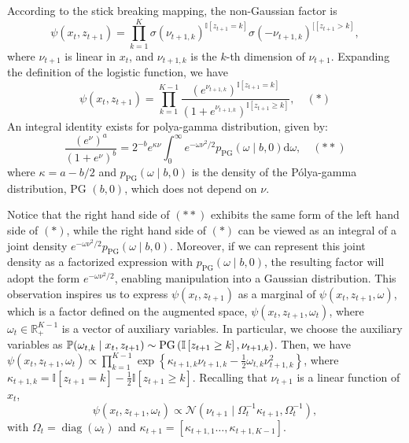 According to the stick breaking mapping, the non-Gaussian factor is
$$\psi\left(x_{t}, z_{t+1}\right)=\prod_{k=1}^{K} \sigma\left(\nu_{t+1, k}\right)^{\mathbb{I}\left[z_{t+1}=k\right]} \sigma\left(-\nu_{t+1, k}\right)^{\mathbb{[}\left[z_{t+1}>k\right]},$$ where  $\nu_{t+1}$ is linear in $x_{t}$, and $\nu_{t+1, k}$ is the $k$-th dimension of $\nu_{t+1}$.  Expanding the definition of the logistic function, we have
$$
\psi\left(x_{t}, z_{t+1}\right)=\prod_{k=1}^{K-1} \frac{\left(e^{\nu_{t+1, k}}\right)^{\mathbb{I}\left[z_{t+1}=k\right]}}{\left(1+e^{\nu_{t+1, k}}\right)^{\mathbb{I}\left[z_{t+1} \geq k\right]}}, \quad (*)
$$
An integral identity exists for polya-gamma distribution, given by:
$$
\frac{\left(e^{\nu}\right)^{a}}{\left(1+e^{\nu}\right)^{b}}=2^{-b} e^{\kappa \nu} \int_{0}^{\infty} e^{-\omega \nu^{2} / 2} p_{\mathrm{PG}}(\omega \mid b, 0) \mathrm{d} \omega, \quad(**)
$$
where $\kappa=a-b / 2$ and $p_{\mathrm{PG}}(\omega \mid b, 0)$ is the density of the Pólya-gamma distribution, PG $(b, 0)$, which does not depend on $\nu$.   

Notice that the right hand side of $(**)$ exhibits the same form of the left hand side of $(*)$, while the right hand side of $(*)$ can be viewed as an integral of a joint density $e^{-\omega \nu^{2} / 2} p_{\mathrm{PG}}(\omega \mid b, 0)$. Moreover, if we can represent this joint density as a factorized expression with $p_{\mathrm{PG}}(\omega \mid b, 0)$, the resulting factor will adopt the form $e^{-\omega \nu^{2} / 2}$, enabling manipulation into a Gaussian distribution. This observation inspires us to 
express  $\psi\left(x_{t}, z_{t+1}\right)$ as a marginal of $\psi\left(x_{t}, z_{t+1}, \omega \right)$, which is a factor defined on the augmented space, $\psi\left(x_{t}, z_{t+1}, \omega_{t}\right)$, where $\omega_{t} \in \mathbb{R}_{+}^{K-1}$ is a vector of auxiliary variables. In particular, we choose the auxiliary variables as $\mathbb{P}(\omega_{t, k} \mid x_{t}, z_{t+1}) \sim \mathrm{PG}\left(\mathbb{I}\left[z_{t+1} \geq k\right], \nu_{t+1, k}\right)$. Then,  we have $\psi\left(x_{t}, z_{t+1}, \omega_{t}\right) \propto \prod_{k=1}^{K-1} \exp \left\{\kappa_{t+1, k} \nu_{t+1, k}-\frac{1}{2} \omega_{t, k} \nu_{t+1, k}^{2}\right\}$, where $\kappa_{t+1, k}=\mathbb{I}\left[z_{t+1}=k\right]-\frac{1}{2} \mathbb{I}\left[z_{t+1} \geq k\right]$. Recalling that $\nu_{t+1}$ is a linear function of $x_{t}$, 
$$
\psi\left(x_{t}, z_{t+1}, \omega_{t}\right) \propto \mathcal{N}\left(\nu_{t+1} \mid \Omega_{t}^{-1} \kappa_{t+1}, \Omega_{t}^{-1}\right),
$$
with $\Omega_{t}=\operatorname{diag}\left(\omega_{t}\right)$ and $\kappa_{t+1}=\left[\kappa_{t+1,1} \ldots, \kappa_{t+1, K-1}\right]$. 

